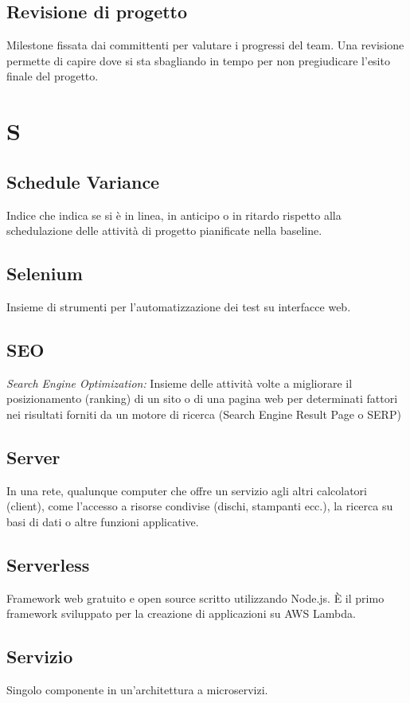 \subsection*{Revisione di progetto}
Milestone fissata dai committenti per valutare i progressi del team. Una revisione permette di capire dove si sta sbagliando in tempo per non pregiudicare l'esito finale del progetto.

\newpage
\section{S}
\subsection*{Schedule Variance}
Indice che indica se si è in linea, in anticipo o in ritardo rispetto alla schedulazione delle attività di progetto pianificate nella baseline.

\subsection*{Selenium}
Insieme di strumenti per l'automatizzazione dei test su interfacce web.

\subsection*{SEO}
\textit{Search Engine Optimization:} Insieme delle attività volte a migliorare il posizionamento (ranking) di un sito o di una pagina web per determinati fattori nei risultati forniti
da un motore di ricerca (Search Engine Result Page o SERP)

\subsection*{Server}
In una rete, qualunque computer che offre un servizio agli altri calcolatori (client), come l'accesso a risorse condivise (dischi, stampanti ecc.), la ricerca su basi di dati o altre funzioni applicative.

\subsection*{Serverless}
Framework web gratuito e open source scritto utilizzando Node.js. È il primo framework sviluppato per la creazione di applicazioni su AWS Lambda.

\subsection*{Servizio}
Singolo componente in un'architettura a microservizi.

